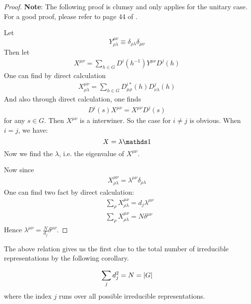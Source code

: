 \begin{proof}
    \textbf{Note}: The following proof is clumsy and only applies for
    the unitary case. For a good proof, please refer to page 44 of
    \cite{Ludeling}.

    Let
    \begin{equation}
        Y_{\rho\lambda}^{\mu\nu} \equiv
        \delta_{\rho\lambda}\delta_{\mu\nu}
    \end{equation}
    Then let
    \begin{align*}
        X^{\mu\nu} = \sum_{h\in G} D^i(h^{-1}) Y^{\mu\nu} D^j(h)
    \end{align*}
    One can find by direct calculation
    \begin{align}
        X^{\mu\nu}_{\rho\lambda}= \sum_{h\in G}
        D^{i*}_{\mu\rho}(h)D^j_{\nu \lambda}(h)
    \end{align}
    And also through direct calculation, one finds
    \begin{align*}
        D^i (s) X^{\mu\nu} = X^{\mu\nu} D^j(s)
    \end{align*}
    for any $s\in G$. 
    Then $X^{\mu\nu}$ is a interwiner. So the case for $i\neq j$ is
    obvious. When $i=j$, we have:
    $$ X = \lambda \id$$
    Now we find the $\lambda$, i.e. the eigenvalue of $X^{\mu\nu}$.
    
    Now since
    \begin{align*}
        X^{\mu\nu}_{\rho\lambda} = \lambda^{\mu\nu}
        \delta_{\rho\lambda}
    \end{align*}
    One can find two fact by direct calculation:
    \begin{align*}
        &\sum_\rho X^{\mu\nu}_{\rho\lambda} = d_j \lambda^{\mu\nu} \\
        &\sum_\rho X^{\mu\nu}_{\rho\lambda} = N \delta^{\mu\nu}
    \end{align*}
    Hence $\lambda^{\mu\nu} = \frac{N}{d_j} \delta^{\mu\nu}$.
\end{proof}
The above relation gives us the first clue to the total number of
irreducible representations by the following corollary. 
\begin{coro}
    \begin{equation}
        \sum_{j} d_j^2 = N = \abs{G}
    \end{equation}
    where the index $j$ runs over all possible irreducible
    representations.
\end{coro}
